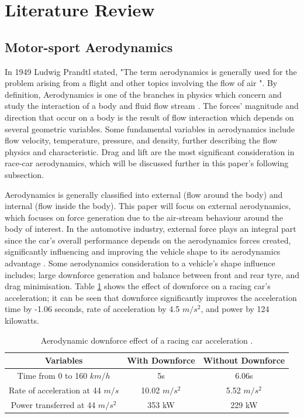 \section{Literature Review}

\subsection{Motor-sport Aerodynamics}
In 1949 Ludwig Prandtl stated, "The term aerodynamics is generally used for the problem arising from a flight and other topics involving the flow of air \cite{Anderson2010FundamentalsAerodynamics}". By definition, Aerodynamics is one of the branches in physics which concern and study the interaction of a body and fluid flow stream \cite{Scibor-Rylski1984RoadAerodynamics}. The forces' magnitude and direction that occur on a body is the result of flow interaction which depends on several geometric variables. Some fundamental variables in aerodynamics include flow velocity, temperature, pressure, and density, further describing the flow physics and characteristic. Drag and lift are the most significant consideration in race-car aerodynamics, which will be discussed further in this paper's following subsection.

\noindent Aerodynamics is generally classified into external (flow around the body) and internal (flow inside the body). This paper will focus on external aerodynamics, which focuses on force generation due to the air-stream behaviour around the body of interest. In the automotive industry, external force plays an integral part since the car's overall performance depends on the aerodynamics forces created, significantly influencing and improving the vehicle shape to its aerodynamics advantage \cite{Scibor-Rylski1984RoadAerodynamics}. Some aerodynamics consideration to a vehicle's shape influence includes; large downforce generation and balance between front and rear tyre, and drag minimisation. Table \ref{Table1} shows the effect of downforce on a racing car's acceleration; it can be seen that downforce significantly improves the acceleration time by -1.06 seconds, rate of acceleration by 4.5 $m/s^2$, and power by 124 kilowatts. 

\begin{table}[!ht]
\caption{\label{Table1} Aerodynamic downforce effect of a racing car acceleration \cite{Scibor-Rylski1984RoadAerodynamics}.}
\vspace{-5mm}
\begin{center}
 \begin{tabular}{||c| c| c ||} 
 \hline
 Variables & With Downforce & Without Downforce \\ [0.5ex] 
 \hline\hline
 Time from 0 to 160 $km/h$ & 5s & 6.06s \\ 
 \hline
 Rate of acceleration at 44 $m/s$ & 10.02 $m/s^{2}$ & 5.52 $m/s^2$ \\
 \hline
 Power transferred at 44 $m/s^2$ & 353 kW & 229 kW  \\
 \hline
\end{tabular}
\end{center}
\end{table}

